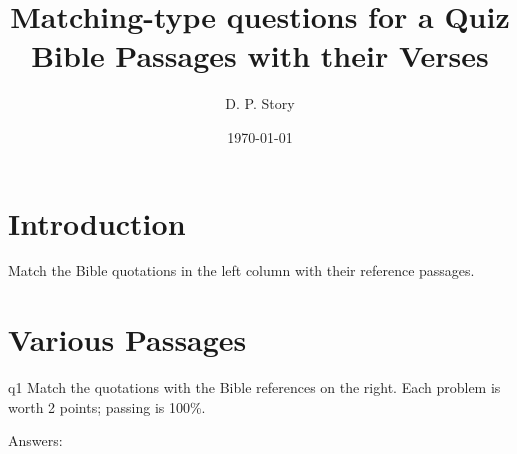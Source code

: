\documentclass[11pt]{article}
\title{Matching-type questions for a Quiz\texorpdfstring{\\[1ex]}{: }Bible Passages with their Verses}
\author{D. P. Story}
\date{\today}
\begin{document}
\maketitle

\section*{Introduction}

Match the Bible quotations in the left column with their reference passages.

\section*{Various Passages}

\begin{quiz}{q1}
Match the quotations with the Bible references on the right.
Each problem is worth 2 points; passing is 100\%.

\noindent
\begin{minipage}[t]{.75\linewidth}
\useNumbersOn
\begin{questions}
\begin{BblPsg}
  \item{}
  \item{}
  \item{}
\end{BblPsg}
\end{questions}
\end{minipage}\hfill
\begin{minipage}[t][0pt]{.25\linewidth-10pt}
\hideCreditMarkup
\begin{questions}[itemsep={0pt}]
\begin{BblVrs}
  \item{}
  \item{}
  \item{}
  \item{}
  \item{}
  \item{}
\end{BblVrs}
\end{questions}
\end{minipage}
\par\medskip
\end{quiz}\quad\PointsField\currQuiz\olBdry\CorrButton\currQuiz\cgBdry[6pt]
Answers: 
\end{document}
